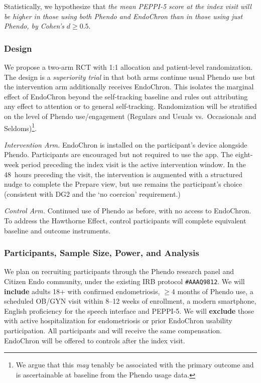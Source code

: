 Statistically, we hypothesize that \textit{the mean PEPPI-5 score at the index visit will be higher in those using both Phendo and EndoChron than in those using just Phendo, by Cohen's} $d \geq 0.5$.

\subsubsection{Design}

We propose a two-arm RCT with 1:1 allocation and patient-level randomization. The design is a \textit{superiority trial}\cite{kishore2020superiority} in that both arms continue usual Phendo use but the intervention arm additionally receives EndoChron. This isolates the marginal effect of EndoChron beyond the self-tracking baseline and rules out attributing any effect to attention or to general self-tracking. Randomization will be stratified on the level of Phendo use/engagement (Regulars and Usuals vs.\ Occasionals and Seldoms\cite{Urteaga2022Engagement})\footnote{We argue that this \textit{may} tenably be associated with the primary outcome and is ascertainable at baseline from the Phendo usage data.}.

\textit{Intervention Arm.} EndoChron is installed on the participant's device alongside Phendo. Participants are encouraged but not required to use the app. The eight-week period preceding the index visit is the active intervention window. In the 48~hours preceding the visit, the intervention is augmented with a structured nudge to complete the Prepare view, but use remains the participant's choice (consistent with DG2 and the `no coercion' requirement.)

\textit{Control Arm.} Continued use of Phendo as before, with no access to EndoChron. To address the Hawthorne Effect\cite{Hutchins1995Cognition}, control participants will complete equivalent baseline and outcome instruments.

\subsubsection{Participants, Sample Size, Power, and Analysis}

We plan on recruiting participants through the Phendo research panel and Citizen Endo community, under the existing IRB protocol \texttt{\#AAAQ9812}\cite{Urteaga2022Engagement}. We will \textbf{include} adults 18+ with confirmed endometriosis, $\geq$4 months of Phendo use, a scheduled OB/GYN visit within 8--12 weeks of enrollment, a modern smartphone, English proficiency for the speech interface and PEPPI-5. We will \textbf{exclude} those with active hospitalization for endometriosis or prior EndoChron usability participation. All participants and will receive the same compensation. EndoChron will be offered to controls after the index visit.

